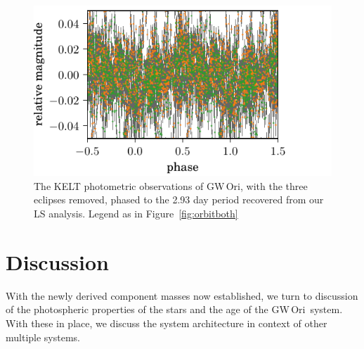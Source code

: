 \documentclass[twocolumn]{aastex61}
\newcommand{\obj}{GW\,Ori}
\begin{document}
\begin{figure}[!ht]
\includegraphics{rotation-phased.pdf}
\caption{The KELT photometric observations of \obj, with the three eclipses removed, phased to the 2.93 day period recovered from our LS analysis. Legend as in Figure~\ref{fig:orbitboth}}
\label{fig:phased}
\end{figure}


\section{Discussion} \label{sec:discussion}
With the newly derived component masses now established, we turn to discussion of the photospheric properties of the stars and the age of the \obj\ system. With these in place, we discuss the system architecture in context of other multiple systems.
\end{document}

